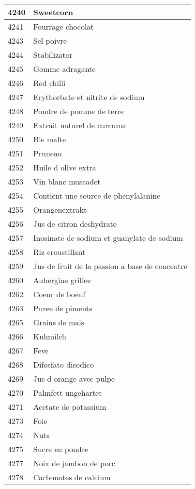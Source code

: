 \begin{longtable}{|l|l|}
4240 & Sweetcorn \\ \hline 
4241 & Fourrage chocolat \\ \hline 
4243 & Sel poivre \\ \hline 
4244 & Stabilizator \\ \hline 
4245 & Gomme adragante \\ \hline 
4246 & Red chilli \\ \hline 
4247 & Erythorbate et nitrite de sodium \\ \hline 
4248 & Poudre de pomme de terre \\ \hline 
4249 & Extrait naturel de curcuma \\ \hline 
4250 & Ble malte \\ \hline 
4251 & Pruneau \\ \hline 
4252 & Huile d olive extra \\ \hline 
4253 & Vin blanc muscadet \\ \hline 
4254 & Contient une source de phenylalanine \\ \hline 
4255 & Orangenextrakt \\ \hline 
4256 & Jus de citron deshydrate \\ \hline 
4257 & Inosinate de sodium et guanylate de sodium \\ \hline 
4258 & Riz croustillant \\ \hline 
4259 & Jus de fruit de la passion a base de concentre \\ \hline 
4260 & Aubergine grillee \\ \hline 
4262 & Coeur de boeuf \\ \hline 
4263 & Puree de piments \\ \hline 
4265 & Grains de mais \\ \hline 
4266 & Kuhmilch \\ \hline 
4267 & Feve \\ \hline 
4268 & Difosfato disodico \\ \hline 
4269 & Jus d orange avec pulpe \\ \hline 
4270 & Palmfett ungehartet \\ \hline 
4271 & Acetate de potassium \\ \hline 
4273 & Foie \\ \hline 
4274 & Nuts \\ \hline 
4275 & Sucre en poudre \\ \hline 
4277 & Noix de jambon de porc \\ \hline 
4278 & Carbonates de calcium \\ \hline 

\end{longtable}
